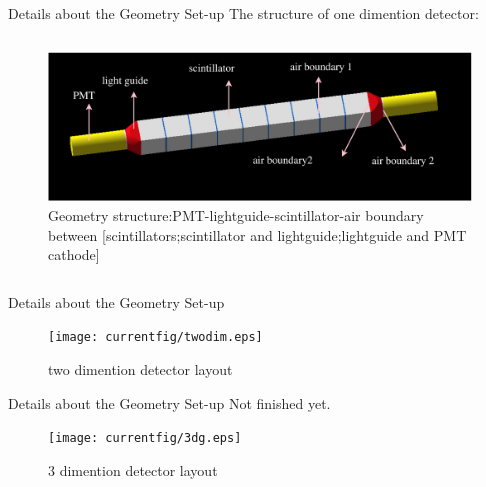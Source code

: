 \documentclass[11pt,compress,xcolor=x11names,UTF8]{beamer}
\begin{document}
\begin{frame}{Details about the Geometry Set-up}
The structure of one dimention detector:
\begin{columns}
\begin{column}{1.05\textwidth}
\begin{figure}
\centering
\includegraphics[width=\textwidth]{currentfig/onedim.eps} %
\caption{Geometry structure:PMT-lightguide-scintillator-air boundary between [scintillators;scintillator and lightguide;lightguide and PMT cathode] }
\end{figure}
\end{column}
\end{columns}
\end{frame}
\begin{frame}{Details about the Geometry Set-up}
\begin{figure}
\centering
\texttt{[image: currentfig/twodim.eps]} %
\caption{two dimention detector layout}
\end{figure}

\end{frame}
\begin{frame}{Details about the Geometry Set-up}
Not finished yet.
\begin{figure}
\centering
\texttt{[image: currentfig/3dg.eps]} %
\caption{3 dimention detector layout}
\end{figure}
\end{frame}
\end{document}

